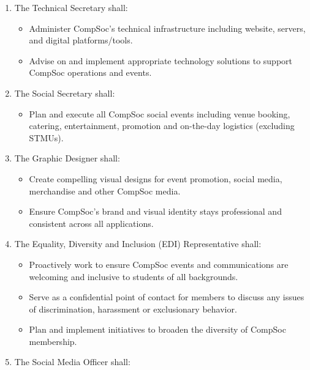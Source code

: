 \begin{enumerate}
\begin{itemize}
        \item Manage daily financial operations, such as making reimbursements and maintaining budgets
        \item Support the Treasurer as needed with financial operations
    \end{itemize}
    \item The Technical Secretary shall:
    \begin{itemize}
        \item Administer CompSoc's technical infrastructure including website, servers, and digital platforms/tools.
        \item Advise on and implement appropriate technology solutions to support CompSoc operations and events.  
    \end{itemize}
    \item The Social Secretary shall:
    \begin{itemize}
        \item Plan and execute all CompSoc social events including venue booking, catering, entertainment, promotion and on-the-day logistics (excluding STMUs).
    \end{itemize}
    \item The Graphic Designer shall: 
    \begin{itemize}
        \item Create compelling visual designs for event promotion, social media, merchandise and other CompSoc media.
        \item Ensure CompSoc's brand and visual identity stays professional and consistent across all applications.
    \end{itemize}
    \item The Equality, Diversity and Inclusion (EDI) Representative shall:
    \begin{itemize}
        \item Proactively work to ensure CompSoc events and communications are welcoming and inclusive to students of all backgrounds. 
        \item Serve as a confidential point of contact for members to discuss any issues of discrimination, harassment or exclusionary behavior.
        \item Plan and implement initiatives to broaden the diversity of CompSoc membership.  
    \end{itemize}
    \item The Social Media Officer shall:  
    \begin{itemize}

\end{itemize}
\end{enumerate}
